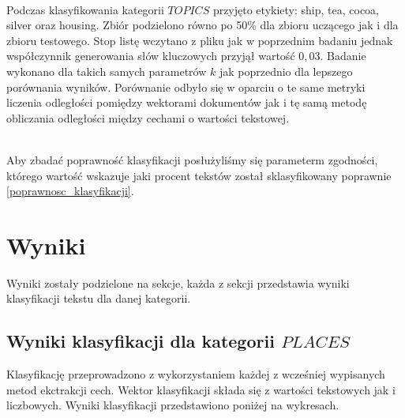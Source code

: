 \documentclass{classrep}
\begin{document}
\\Podczas klasyfikowania kategorii $TOPICS$ przyjęto etykiety: ship, tea, cocoa, silver oraz housing.
Zbiór podzielono równo po 50\% dla zbioru uczącego jak i dla zbioru testowego. Stop listę wczytano z pliku
jak w poprzednim badaniu jednak współczynnik generowania słów kluczowych przyjął wartość $0,03$. Badanie
wykonano dla takich samych parametrów $k$ jak poprzednio dla lepszego porównania wyników. Porównanie odbyło
się w oparciu o te same metryki liczenia odległości pomiędzy wektorami dokumentów jak i tę samą metodę
obliczania odległości między cechami o wartości tekstowej.

\\ Aby zbadać poprawność klasyfikacji posłużyliśmy się parameterm zgodności, którego wartość wskazuje
jaki procent tekstów został sklasyfikowany poprawnie \ref{poprawnosc_klasyfikacji}.




\section{Wyniki}
Wyniki zostały podzielone na sekcje, każda z sekcji przedstawia wyniki klasyfikacji tekstu dla danej kategorii.
\subsection{Wyniki klasyfikacji dla kategorii $PLACES$}
Klasyfikację przeprowadzono z wykorzystaniem każdej z wcześniej wypisanych metod ekctrakcji cech. Wektor
klasyfikacji składa się z wartości tekstowych jak i liczbowych. Wyniki klasyfikacji przedstawiono poniżej
na wykresach.
\end{document}
